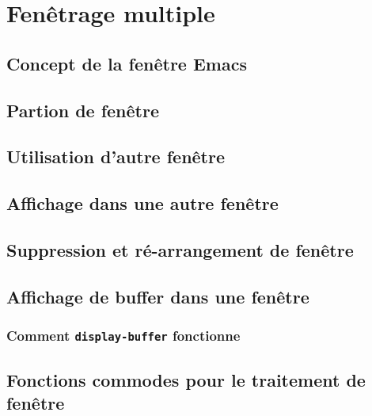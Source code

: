\chapter{Fenêtrage multiple}\label{chap17}

\section{Concept de la fenêtre Emacs}\label{chap17sec1}
\section{Partion de fenêtre}\label{chap17sec2}
\section{Utilisation d'autre fenêtre}\label{chap17sec3}
\section{Affichage dans une autre fenêtre}\label{chap17sec4}
\section{Suppression et ré-arrangement de fenêtre}\label{chap17sec5}
\section{Affichage de buffer dans une fenêtre}\label{chap17sec6}
\subsection{Comment \texttt{display-buffer}
  fonctionne}\label{chap17sec6subsec1} 
\section{Fonctions commodes pour le traitement de
  fenêtre}\label{chap17sec7} 